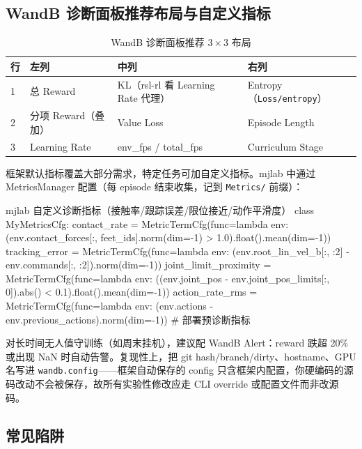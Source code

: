 \subsection{WandB 诊断面板推荐布局与自定义指标}

\begin{table}[H]
\centering
\caption{WandB 诊断面板推荐 $3\times3$ 布局}
\label{tab:rlmc-diag-panel}
\begin{tabular}{p{1.0cm}p{3.4cm}p{3.4cm}p{3.4cm}}
\hline
行 & 左列 & 中列 & 右列 \\
\hline
1 & 总 Reward & KL（rsl-rl 看 Learning Rate 代理） & Entropy（\texttt{Loss/\allowbreak entropy}） \\
2 & 分项 Reward（叠加） & Value Loss & Episode Length \\
3 & Learning Rate & env\_fps / total\_fps & Curriculum Stage \\
\hline
\end{tabular}
\end{table}

框架默认指标覆盖大部分需求，特定任务可加自定义指标。mjlab 中通过 MetricsManager 配置（每 episode 结束收集，记到 \verb|Metrics/| 前缀）：

\begin{codebox}[Python]{mjlab 自定义诊断指标（接触率/跟踪误差/限位接近/动作平滑度）}
class MyMetricsCfg:
    contact_rate = MetricTermCfg(func=lambda env:
        (env.contact_forces[:, feet_ids].norm(dim=-1) > 1.0).float().mean(dim=-1))
    tracking_error = MetricTermCfg(func=lambda env:
        (env.root_lin_vel_b[:, :2] - env.commands[:, :2]).norm(dim=-1))
    joint_limit_proximity = MetricTermCfg(func=lambda env:
        ((env.joint_pos - env.joint_pos_limits[:, 0]).abs() < 0.1).float().mean(dim=-1))
    action_rate_rms = MetricTermCfg(func=lambda env:
        (env.actions - env.previous_actions).norm(dim=-1))  # 部署预诊断指标
\end{codebox}

对长时间无人值守训练（如周末挂机），建议配 WandB Alert：reward 跌超 20\% 或出现 NaN 时自动告警。复现性上，把 git hash/branch/dirty、hostname、GPU 名写进 \verb|wandb.config|——框架自动保存的 config 只含框架内配置，你硬编码的源码改动不会被保存，故所有实验性修改应走 CLI override 或配置文件而非改源码。

\subsection{常见陷阱}


